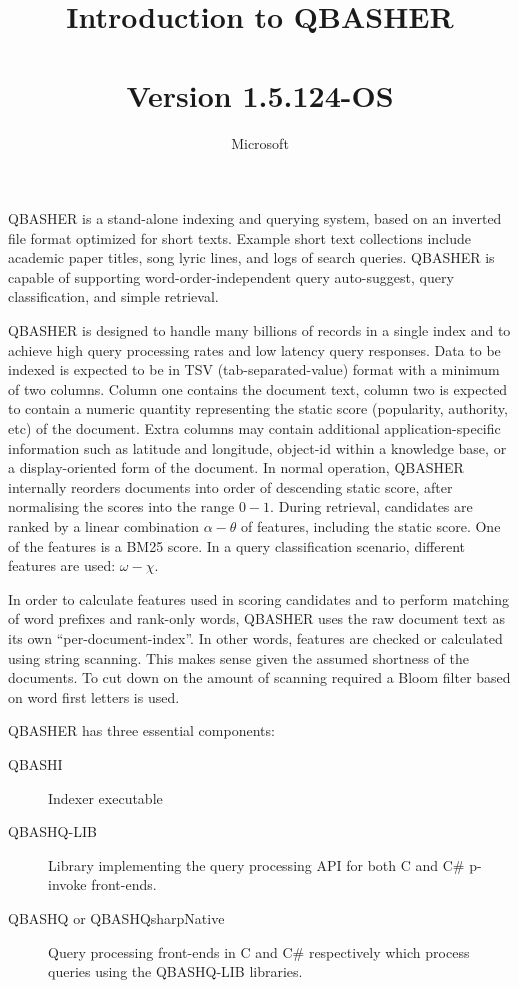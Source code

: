 \documentclass{article}
\title{Introduction to QBASHER\\
  \large ~\\
  Version 1.5.124-OS}
\author{Microsoft}
\begin{document}
\maketitle{}


QBASHER is a stand-alone indexing and querying system, based on an
inverted file format optimized for short texts.  Example short text
collections include academic paper titles, song lyric lines, and logs
of search queries.  QBASHER is capable of supporting
word-order-independent query auto-suggest, query
classification, and simple retrieval.

QBASHER is designed to handle many billions of records in a single
index and to achieve high query processing rates and low latency query
responses.  Data to be indexed is expected to be in TSV
(tab-separated-value) format with a
minimum of two columns.  Column one contains the document text, column
two is expected to contain a numeric quantity representing the static
score (popularity, authority, etc) of the document. Extra columns
may contain additional application-specific information such as
latitude and longitude, object-id within a knowledge base, or a
display-oriented form of the document.   In normal operation, QBASHER
internally reorders documents into order of descending static score,
after normalising the scores into the range $0-1$.  During retrieval,
candidates are ranked by a linear combination $\alpha - \theta$ of
features, including the static score.  One of the features is a BM25
score. In a query classification scenario, different features are
used: $\omega - \chi$.

In order to calculate features used in scoring candidates and to
perform matching of word prefixes and rank-only words, QBASHER uses
the raw document text as its own ``per-document-index''.  In other
words, features are checked or calculated using string scanning.  This
makes sense given the assumed shortness of the documents.  To cut down
on the amount of scanning required a Bloom filter based on word first
letters is used.

QBASHER has three essential components:

\begin{description}
\item [QBASHI] Indexer executable
  \item [QBASHQ-LIB] Library implementing the query processing API for
    both C and C\# p-invoke front-ends.
    \item [QBASHQ or QBASHQsharpNative] Query processing front-ends
      in C and C\# respectively which process queries using the
      QBASHQ-LIB libraries.
\end{description}
\end{document}
